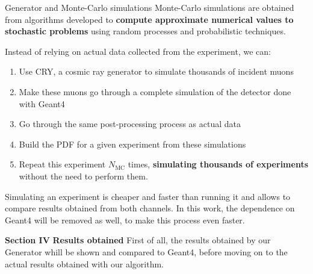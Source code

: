 \documentclass[8 pt]{beamer}
\begin{document}
\begin{frame}{Generator and Monte-Carlo simulations}
\justifying
Monte-Carlo simulations are obtained from algorithms developed to \textbf{compute approximate numerical values to stochastic problems} using random processes and probabilistic techniques. \vfill

Instead of relying on actual data collected from the experiment, we can:
\begin{enumerate}
\justifying
\item Use CRY, a cosmic ray generator to simulate thousands of incident muons
\item Make these muons go through a complete simulation of the detector done with Geant4
\item Go through the same post-processing process as actual data
\item Build the PDF for a given experiment from these simulations
\item Repeat this experiment $N_\text{MC}$ times, \textbf{simulating thousands of experiments} without the need to perform them.
\end{enumerate} \vfill

Simulating an experiment is cheaper and faster than running it and allows to compare results obtained from both channels. In this work, the dependence on Geant4 will be removed as well, to make this process even faster. \vfill
\end{frame}










\begin{frame}{}
\centering
	\huge{\textbf{\color{mycolor} Section IV}} \newline
	\LARGE{\textbf{\color{mycolor} Results obtained \color{black}}} \vfill
\Large{First of all, the results obtained by our Generator whill be shown and compared to Geant4, before moving on to the actual results obtained with our algorithm.} \vfill
\end{frame}
\end{document}
